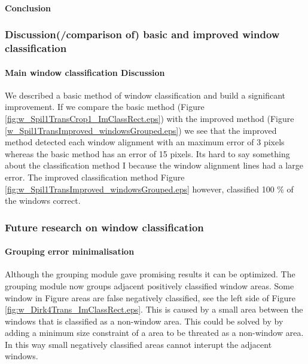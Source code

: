 \paragraph{Conclusion} %


\subsubsection{Discussion(/comparison of) basic and improved window classification}
\paragraph{Main window classification Discussion}
We described a basic method of window classification and build a significant improvement.
If we compare the basic method (Figure \ref{fig:w_Spil1TransCrop1_ImClassRect.eps})
with the improved method (Figure \ref{w_Spil1TransImproved_windowsGrouped.eps})
we see that the improved method detected each window alignment with an maximum
error of 3 pixels whereas the basic method has an error of 15 pixels.  Its hard
to say something about the classification method I because the window alignment
lines had a large error.
The improved classification method Figure
\ref{fig:w_Spil1TransImproved_windowsGrouped.eps} however, classified 100 \% of
the windows correct.



\subsubsection{Future research on window classification} 
\label{sec:futureResearchWindowClassification}
\paragraph{Grouping error minimalisation}
Although the grouping module gave promising results it can be optimized.  The
grouping module now groups adjacent positively classified window areas.  Some
window in Figure areas are false negatively classified, see the left side of
Figure \ref{fig:w_Dirk4Trans_ImClassRect.eps}.  This is caused by a small area
between the windows that is classified as a non-window area. This could be
solved by by adding a minimum size constraint of a area to be threated as a
non-window area.  In this way small negatively classified areas cannot interupt
the adjacent windows.

